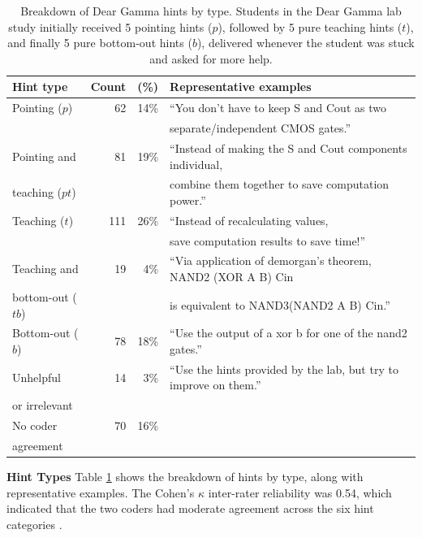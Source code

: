 \begin{table}[t]
\footnotesize
  \begin{center}
    \begin{tabular}{|l|r|r|l|}
\hline
      {\bf Hint type} & {\bf Count} & {\bf (\%)} & {\bf Representative examples} \\
\hline
      Pointing ($p$) & 62 & 14\% & ``You don't have to keep S and Cout as two  \\
       & & & separate/independent CMOS gates.'' \\
      \hline
      Pointing and  & 81 & 19\% & ``Instead of making the S and Cout components individual, \\
teaching ($pt$) & & & combine them together to save computation power.'' \\

\hline
      Teaching ($t$) & 111 & 26\% & ``Instead of recalculating values,  \\
      & & & save computation results to save time!'' \\
\hline
      Teaching and & 19 & 4\% & ``Via application of demorgan's theorem, NAND2 (XOR A B) Cin \\
bottom-out ($tb$) & & & is equivalent to NAND3(NAND2 A B) Cin.''\\
\hline
      Bottom-out ($b$) & 78 & 18\% & ``Use the output of a xor b for one of the nand2 gates.'' \\
\hline
      Unhelpful & 14 & 3\% & ``Use the hints provided by the lab, but try to improve on them.'' \\
      or irrelevant & & & \\
\hline
No coder & 70 & 16\% & \\
agreement & & & \\
\hline
    \end{tabular}
 \caption{Breakdown of Dear Gamma hints by type. Students in the Dear Gamma lab study initially received 5 pointing hints ($p$), followed by 5 pure teaching hints ($t$), and finally 5 pure bottom-out hints ($b$), delivered whenever the student was stuck and asked for more help. }
 \label{tab:hintTypes}
  \end{center}
   
\end{table}


{\bf Hint Types} Table \ref{tab:hintTypes} shows the breakdown of hints by type, along with representative examples. The Cohen's $\kappa$ \cite{cohen1960coefficient} inter-rater reliability was 0.54, which indicated that the two coders had moderate agreement across the six hint categories \cite{viera2005understanding}. 

